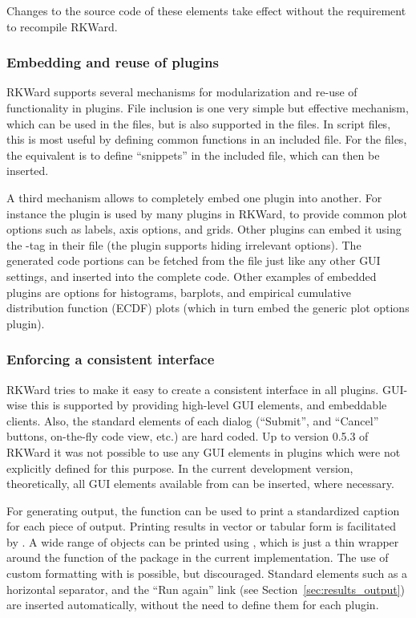 Changes to the source code of these elements take effect without the requirement to recompile RKWard.

\subsubsection{Embedding and reuse of plugins}
\label{sec:technical_plugins_embedding}
RKWard supports several mechanisms for modularization and re-use of
functionality in plugins. File inclusion is one very simple but effective
mechanism, which can be used in the  files, but is also supported in
the  files. In script files, this is most useful by defining common functions
in an included file. For the  files, the equivalent is to define ``snippets''
in the included file, which can then be inserted.

A third mechanism allows to completely embed one plugin into another. For
instance the  plugin is used by many plugins in RKWard, to provide
common plot options such as labels, axis options, and grids. Other plugins
can embed it using the -tag in their  file (the plugin supports
hiding irrelevant options). The generated code portions can be fetched from the
 file just like any other GUI settings, and inserted into the complete
code. Other examples of embedded plugins are options for histograms, barplots,
and empirical cumulative distribution function (ECDF) plots (which in turn embed the generic plot options plugin).

\subsubsection{Enforcing a consistent interface}
\label{sec:technical_plugins_consistency}
RKWard tries to make it easy to create a consistent interface in all plugins.
GUI-wise this is supported by providing high-level GUI elements, and embeddable
clients. Also, the standard elements of each dialog (``Submit'', and
``Cancel'' buttons, on-the-fly code view, etc.) are hard coded. Up to version
0.5.3 of RKWard it was not possible to use any GUI elements in plugins which
were not explicitly defined for this purpose. In the current development
version, theoretically, all GUI elements available from  can be inserted,
where necessary.

For generating output, the function  can be used to print a
standardized caption for each piece of output. Printing results in vector or
tabular form is facilitated by . A wide range of objects can be
printed using , which is just a thin wrapper around the
 function of the  package \citep{Lecoutre2003} in the current
implementation. The use of custom formatting with  is possible, but
discouraged. Standard elements such as a horizontal separator, and the ``Run again''
link (see Section~\ref{sec:results_output}) are inserted automatically, without the need to define
them for each plugin.

